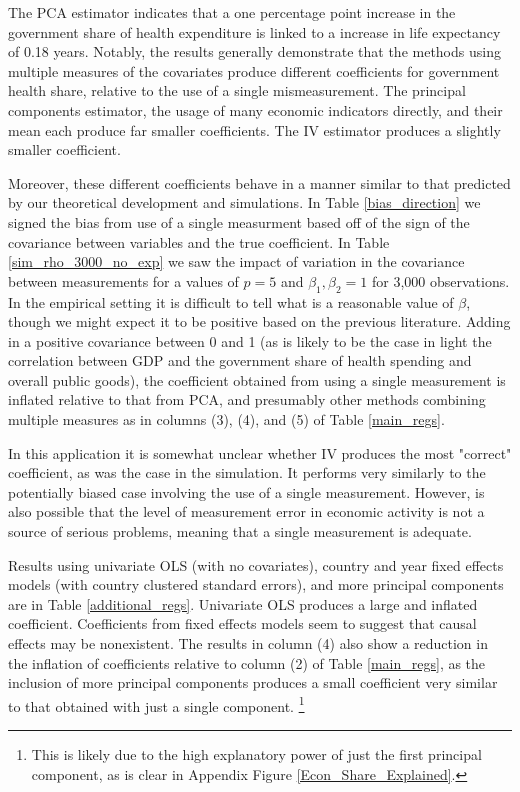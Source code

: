 \documentclass[10pt]{article}
\begin{document}
        

        The PCA estimator indicates that a one percentage point increase in the government share of health expenditure is linked to a increase in life expectancy of 0.18 years. Notably, the results generally demonstrate that the methods using multiple measures of the covariates produce different coefficients for government health share, relative to the use of a single mismeasurement. The principal components estimator, the usage of many economic indicators directly, and their mean each produce far smaller coefficients. The IV estimator produces a slightly smaller coefficient.

        Moreover, these different coefficients behave in a manner similar to that predicted by our theoretical development and simulations. In Table \ref{bias_direction} we signed the bias from use of a single measurment based off of the sign of the covariance between variables and the true coefficient. In Table \ref{sim_rho_3000_no_exp} we saw the impact of variation in the covariance between measurements for a values of $p = 5$ and $\beta_1, \beta_2 = 1$ for 3,000 observations. In the empirical setting it is difficult to tell what is a reasonable value of $\beta$, though we might expect it to be positive based on the previous literature. Adding in a positive covariance between 0 and 1 (as is likely to be the case in light the correlation between GDP and the government share of health spending and overall public goods), the coefficient obtained from using a single measurement is inflated relative to that from PCA, and presumably other methods combining multiple measures as in columns (3), (4), and (5) of Table \ref{main_regs}.

        In this application it is somewhat unclear whether IV produces the most "correct" coefficient, as was the case in the simulation. It performs very similarly to the potentially biased case involving the use of a single measurement. However, is also possible that the level of measurement error in economic activity is not a source of serious problems, meaning that a single measurement is adequate.

        Results using univariate OLS (with no covariates), country and year fixed effects models (with country clustered standard errors), and more principal components are in Table \ref{additional_regs}. Univariate OLS produces a large and inflated coefficient. Coefficients from fixed effects models seem to suggest that causal effects may be nonexistent. The results in column (4) also show a reduction in the inflation of coefficients relative to column (2) of Table \ref{main_regs}, as the inclusion of more principal components produces a small coefficient very similar to that obtained with just a single component. \footnote{This is likely due to the high explanatory power of just the first principal component, as is clear in Appendix Figure \ref{Econ_Share_Explained}.}
\end{document}
